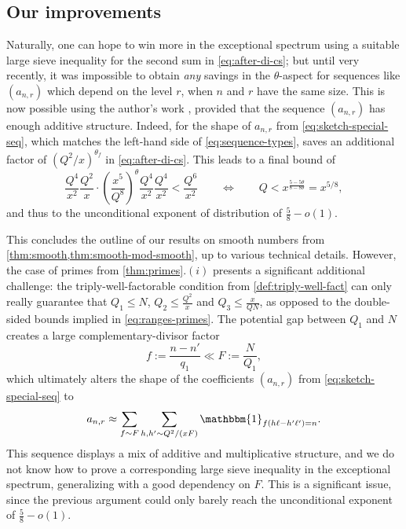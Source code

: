 \documentclass[reqno,11pt]{amsart}
\theoremstyle{remark}
\numberwithin{equation}{section}
\newcommand{\one}{\mathbbm{1}}
\begin{document}
\subsection{Our improvements} \label{subsec:improvements}

Naturally, one can hope to win more in the exceptional spectrum using a suitable large sieve inequality for the second sum in \cref{eq:after-di-cs}; but until very recently, it was impossible to obtain \emph{any} savings in the $\theta$-aspect for sequences like $(a_{n,r})$ which depend on the level $r$, when $n$ and $r$ have the same size. This is now possible using the author's work \cite{pascadi2024large}, provided that the sequence $(a_{n,r})$ has enough additive structure. Indeed, for the shape of $a_{n,r}$ from \cref{eq:sketch-special-seq}, which matches the left-hand side of \cref{eq:sequence-types}, \cite[Theorem 3]{pascadi2024large} saves an additional factor of $(Q^2/x)^{\theta_f}$ in \cref{eq:after-di-cs}. This leads to a final bound of
\[
    \frac{Q^4}{x^2} \frac{Q^2}{x} \cdot \left(\frac{x^5}{Q^8}\right)^\theta \frac{Q^4}{x^2} \frac{Q^4}{x^2} 
    < 
    \frac{Q^6}{x^2}
    \qquad \iff 
    \qquad 
    Q < x^{\frac{5-5\theta}{8-8\theta}} = x^{5/8},
\]
and thus to the unconditional exponent of distribution of $\tfrac{5}{8} - o(1)$.

This concludes the outline of our results on smooth numbers from \cref{thm:smooth,thm:smooth-mod-smooth}, up to various technical details. However, the case of primes from \cref{thm:primes}.$(i)$ presents a significant additional challenge: the triply-well-factorable condition from \cref{def:triply-well-fact} can only really guarantee that $Q_1 \le N$, $Q_2 \le \frac{Q^2}{x}$ and $Q_3 \le \frac{x}{QN}$, as opposed to the double-sided bounds implied in \cref{eq:ranges-primes}. The potential gap between $Q_1$ and $N$ creates a large complementary-divisor factor 
\[
    f := \frac{n-n'}{q_1} \ll F := \frac{N}{Q_1},
\] 
which ultimately alters the shape of the coefficients $(a_{n,r})$ from \cref{eq:sketch-special-seq} to
\[
    a_{n,r} \approx 
    \sum_{f \sim F}
    \sum_{h, h' \sim Q^2/(xF)} \one_{f(h\ell - h'\ell') = n}.
\]
This sequence displays a mix of additive and multiplicative structure, and we do not know how to prove a corresponding large sieve inequality in the exceptional spectrum, generalizing \cite[Theorem 3]{pascadi2024large} with a good dependency on $F$. This is a significant issue, since the previous argument could only barely reach the unconditional exponent of $\tfrac{5}{8} - o(1)$.
\end{document}
